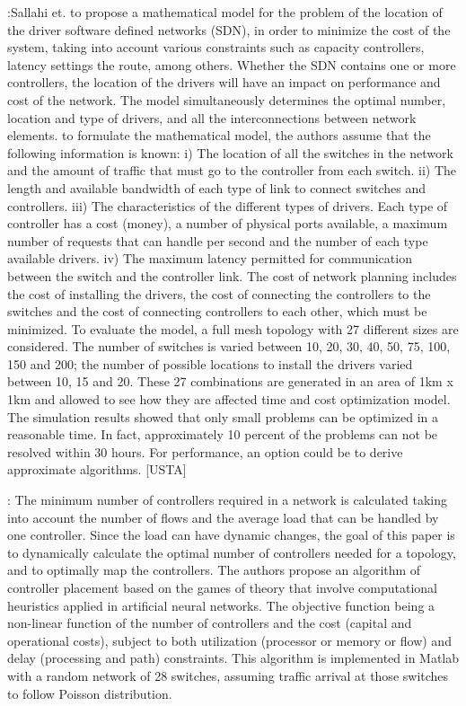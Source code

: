 \documentclass[a4paper,10pt]{article}
\begin{document}
\cite{SaSt15}:Sallahi et. to propose a mathematical model for the problem of the location of the driver software defined networks (SDN), in order to minimize the cost of the system, taking into account various constraints such as capacity controllers, latency settings the route, among others. Whether the SDN contains one or more controllers, the location of the drivers will have an impact on performance and cost of the network. The model simultaneously determines the optimal number, location and type of drivers, and all the interconnections between network elements.
to formulate the mathematical model, the authors assume that the following information is known: i) The location of all the switches in the network and the amount of traffic that must go to the controller from each switch. ii) The length and available bandwidth of each type of link to connect switches and controllers. iii) The characteristics of the different types of drivers. Each type of controller has a cost (money), a number of physical ports available, a maximum number of requests that can handle per second and the number of each type available drivers. iv) The maximum latency permitted for communication between the switch and the controller link.
The cost of network planning includes the cost of installing the drivers, the cost of connecting the controllers to the switches and the cost of connecting controllers to each other, which must be minimized.
To evaluate the model, a full mesh topology with 27 different sizes are considered. The number of switches is varied between 10, 20, 30, 40, 50, 75, 100, 150 and 200; the number of possible locations to install the drivers varied between 10, 15 and 20. These 27 combinations are generated in an area of 1km x 1km and allowed to see how they are affected time and cost optimization model. The simulation results showed that only small problems can be optimized in a reasonable time. In fact, approximately 10 percent of the problems can not be resolved within 30 hours. For performance, an option could be to derive approximate algorithms.
[USTA]

\cite{RaRe14}: The minimum number of controllers required in a network is calculated taking into account the number of flows and the average load that can be handled by one controller. Since the load can have dynamic changes, the goal of this paper is to dynamically calculate the optimal number of controllers needed for a topology, and to optimally map the controllers. The authors propose an algorithm of controller placement based on the games of theory that involve computational heuristics applied in artificial neural networks. The objective function being a non-linear function of the number of controllers and the cost (capital and operational costs), subject to both utilization (processor or memory or flow) and delay (processing and path) constraints. This algorithm is implemented in Matlab with a random network of 28 switches, assuming traffic arrival at those switches to follow Poisson distribution.
\end{document}
